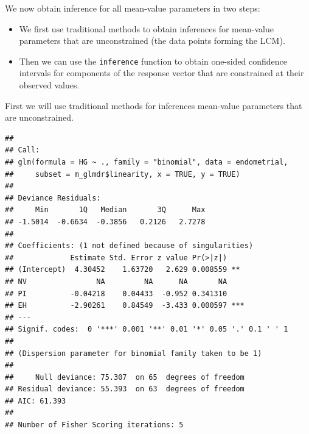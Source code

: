 \documentclass[
  ignorenonframetext,
]{beamer}
\newenvironment{Shaded}{\begin{snugshade}}{\end{snugshade}}
\newcommand{\AttributeTok}[1]{\textcolor[rgb]{0.77,0.63,0.00}{#1}}
\newcommand{\FunctionTok}[1]{\textcolor[rgb]{0.00,0.00,0.00}{#1}}
\newcommand{\NormalTok}[1]{#1}
\newcommand{\OtherTok}[1]{\textcolor[rgb]{0.56,0.35,0.01}{#1}}
\newcommand{\SpecialCharTok}[1]{\textcolor[rgb]{0.00,0.00,0.00}{#1}}
\providecommand{\tightlist}{%
  \setlength{\itemsep}{0pt}\setlength{\parskip}{0pt}}
\begin{document}
\begin{frame}{}
\protect\hypertarget{section-24}{}
We now obtain inference for all mean-value parameters in two steps:

\begin{itemize}
\tightlist
\item
  We first use traditional methods to obtain inferences for mean-value
  parameters that are unconstrained (the data points forming the LCM).
\item
  Then we can use the \texttt{inference} function to obtain one-sided
  confidence intervals for components of the response vector that are
  constrained at their observed values.
\end{itemize}
\end{frame}

\begin{frame}[fragile]{}
\protect\hypertarget{section-25}{}
First we will use traditional methods for inferences mean-value
parameters that are unconstrained.

\tiny

\begin{Shaded}
\end{Shaded}

\begin{verbatim}
## 
## Call:
## glm(formula = HG ~ ., family = "binomial", data = endometrial, 
##     subset = m_glmdr$linearity, x = TRUE, y = TRUE)
## 
## Deviance Residuals: 
##     Min       1Q   Median       3Q      Max  
## -1.5014  -0.6634  -0.3856   0.2126   2.7278  
## 
## Coefficients: (1 not defined because of singularities)
##             Estimate Std. Error z value Pr(>|z|)    
## (Intercept)  4.30452    1.63720   2.629 0.008559 ** 
## NV                NA         NA      NA       NA    
## PI          -0.04218    0.04433  -0.952 0.341310    
## EH          -2.90261    0.84549  -3.433 0.000597 ***
## ---
## Signif. codes:  0 '***' 0.001 '**' 0.01 '*' 0.05 '.' 0.1 ' ' 1
## 
## (Dispersion parameter for binomial family taken to be 1)
## 
##     Null deviance: 75.307  on 65  degrees of freedom
## Residual deviance: 55.393  on 63  degrees of freedom
## AIC: 61.393
## 
## Number of Fisher Scoring iterations: 5
\end{verbatim}
\end{frame}
\end{document}
